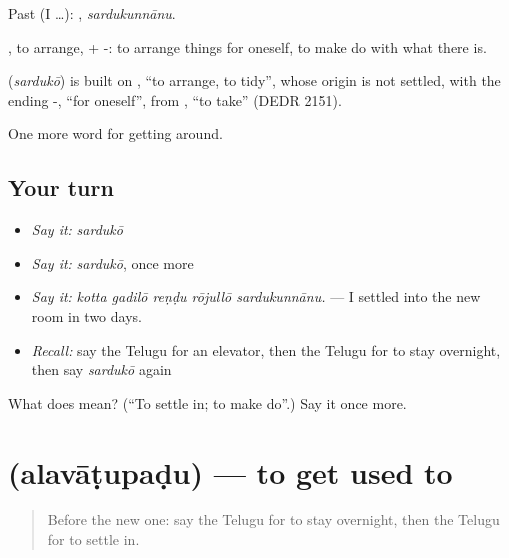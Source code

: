 Past (I …): , \emph{sardukunnānu}.

, to arrange, + -: to arrange things for oneself, to make do with what there is.

\begin{cousinweb}
\textbf{} (\emph{sardukō}) is built on , \textquotedblleft{}to arrange, to tidy\textquotedblright{}, whose origin is not settled, with the ending -, \textquotedblleft{}for oneself\textquotedblright{}, from , \textquotedblleft{}to take\textquotedblright{} (DEDR 2151).
\end{cousinweb}

\begin{grammarlens}[title={What you've built}]
One more word for getting around.
\end{grammarlens}

\subsection*{Your turn}
\begin{itemize}
\raggedright
  \item \emph{Say it:} \emph{sardukō}
  \item \emph{Say it:} \emph{sardukō}, once more
  \item \emph{Say it:} \emph{kotta gadilō reṇḍu rōjullō sardukunnānu.} — I settled into the new room in two days.
  \item \emph{Recall:} say the Telugu for an elevator, then the Telugu for to stay overnight, then say \emph{sardukō} again
\end{itemize}

\begin{tcolorbox}[breakable,colback=teal!4,colframe=teal!35!black,title={Before you move on}]
What does  mean? (\textquotedblleft{}To settle in; to make do\textquotedblright{}.) Say it once more.
\end{tcolorbox}
\section[\texorpdfstring{\te{అలవాటుపడు} (alavāṭupaḍu)}{అలవాటుపడు (alavāṭupaḍu)}]{ (alavāṭupaḍu) — to get used to}

\label{lesson:TE-C458-alavatupadu}



\begin{quote}
Before the new one: say the Telugu for to stay overnight, then the Telugu for to settle in.
\end{quote}


